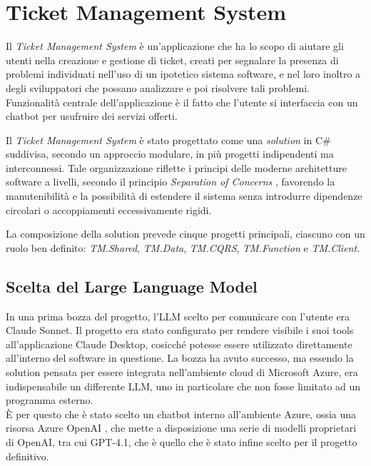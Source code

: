 \chapter{Ticket Management System}

Il \textit{Ticket Management System} è un'applicazione che ha lo scopo di aiutare gli utenti nella creazione e gestione di ticket,
creati per segnalare la presenza di problemi individuati nell'uso di un ipotetico sistema software, e nel loro inoltro a degli sviluppatori
che possano analizzare e poi risolvere tali problemi. Funzionalità centrale dell'applicazione è il fatto che l'utente si interfaccia con un chatbot
per usufruire dei servizi offerti.

Il \textit{Ticket Management System} è stato progettato come una \textit{solution} in C\# suddivisa, secondo un approccio modulare,
in più progetti indipendenti ma interconnessi. Tale organizzazione riflette i principi delle moderne architetture software a livelli,
secondo il principio \textit{Separation of Concerns} \cite{msdn2009separation}, favorendo la manutenibilità e la possibilità di estendere il sistema
senza introdurre dipendenze circolari o accoppiamenti eccessivamente rigidi.

La composizione della solution prevede cinque progetti principali, ciascuno con un ruolo ben definito: \textit{TM.Shared}, \textit{TM.Data},
\textit{TM.CQRS}, \textit{TM.Function} e \textit{TM.Client}.

\newpage
\section{Scelta del Large Language Model}
In una prima bozza del progetto, l'LLM scelto per comunicare con l'utente era Claude Sonnet. Il progetto era stato configurato per rendere visibile i suoi
tools all'applicazione Claude Desktop, cosicché potesse essere utilizzato direttamente all'interno del software in questione. La bozza ha avuto successo, ma
essendo la solution pensata per essere integrata nell'ambiente cloud di Microsoft Azure, era indispensabile un differente LLM, uno in particolare che non fosse
limitato ad un programma esterno. \\
È per questo che è stato scelto un chatbot interno all'ambiente Azure, ossia una risorsa Azure OpenAI \cite{azure_openai_foundry}, che mette a disposizione
una serie di modelli proprietari di OpenAI, tra cui GPT-4.1, che è quello che è stato infine scelto per il progetto definitivo.

\newpage
